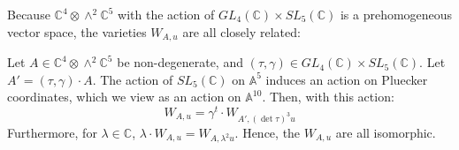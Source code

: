 \documentclass{report}
\begin{document}
Because $\mathbb{C}^4 \otimes \wedge^2 \mathbb{C}^5$ with the action of $GL_4(\mathbb{C}) \times SL_5(\mathbb{C})$ is a prehomogeneous vector space, the varieties $W_{A,u}$ are all closely related:
\begin{prop} \label{W varieties}
Let $A \in \mathbb{C}^4 \otimes \wedge^2 \mathbb{C}^5$ be non-degenerate, and $(\tau,\gamma) \in GL_4(\mathbb{C}) \times SL_5(\mathbb{C})$.  Let $A' = (\tau, \gamma) \cdot A$.  The action of $SL_5(\mathbb{C})$ on $\mathbb{A}^5$ induces an action on Pluecker coordinates, which we view as an action on $\mathbb{A}^{10}$.  Then, with this action:
\begin{equation}
W_{A,u} = \gamma^t \cdot W_{A', (\det \tau)^3 u}
\end{equation}
Furthermore, for $\lambda \in \mathbb{C}$, $\lambda \cdot W_{A,u} = W_{A,\lambda^2 u }$.  Hence, the $W_{A,u}$ are all isomorphic.
\end{prop}
\end{document}

